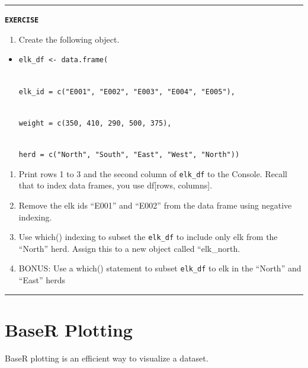 \documentclass[
]{book}
\providecommand{\tightlist}{%
  \setlength{\itemsep}{0pt}\setlength{\parskip}{0pt}}
\begin{document}
\begin{center}\rule{0.5\linewidth}{0.5pt}\end{center}

\textbf{\texttt{EXERCISE}}

\begin{enumerate}
\def\labelenumi{\arabic{enumi}.}
\tightlist
\item
  Create the following object.
\end{enumerate}

\begin{itemize}
\tightlist
\item
  \texttt{elk\_df\ \textless{}-\ data.frame(}\strut \\
  \texttt{elk\_id\ =\ c("E001",\ "E002",\ "E003",\ "E004",\ "E005"),}\strut \\
  \texttt{weight\ =\ c(350,\ 410,\ 290,\ 500,\ 375),}\strut \\
  \texttt{herd\ =\ c("North",\ "South",\ "East",\ "West",\ "North"))}
\end{itemize}

\begin{enumerate}
\def\labelenumi{\arabic{enumi}.}
\setcounter{enumi}{1}
\tightlist
\item
  Print rows 1 to 3 and the second column of \texttt{elk\_df} to the Console. Recall that to index data frames, you use df{[}rows, columns{]}.
\item
  Remove the elk ids ``E001'' and ``E002'' from the data frame using negative indexing.
\item
  Use which() indexing to subset the \texttt{elk\_df} to include only elk from the ``North'' herd. Assign this to a new object called ``elk\_north.
\item
  BONUS: Use a which() statement to subset \texttt{elk\_df} to elk in the ``North'' and ``East'' herds
\end{enumerate}

\begin{center}\rule{0.5\linewidth}{0.5pt}\end{center}

\section{BaseR Plotting}\label{baser-plotting}

BaseR plotting is an efficient way to visualize a dataset.
\end{document}
